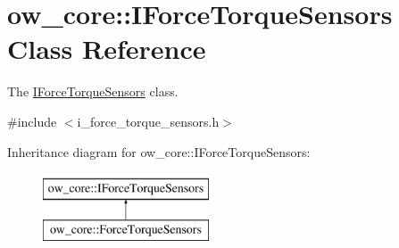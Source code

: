 \hypertarget{classow__core_1_1IForceTorqueSensors}{}\section{ow\+\_\+core\+:\+:I\+Force\+Torque\+Sensors Class Reference}
\label{classow__core_1_1IForceTorqueSensors}


The \hyperlink{classow__core_1_1IForceTorqueSensors}{I\+Force\+Torque\+Sensors} class.  




{\ttfamily \#include $<$i\+\_\+force\+\_\+torque\+\_\+sensors.\+h$>$}

Inheritance diagram for ow\+\_\+core\+:\+:I\+Force\+Torque\+Sensors\+:\begin{figure}[H]
\begin{center}
\leavevmode
\includegraphics[height=2.000000cm]{dc/da2/classow__core_1_1IForceTorqueSensors}
\end{center}
\end{figure}
